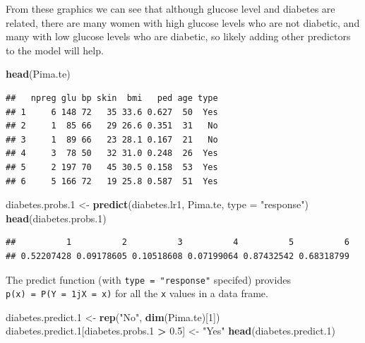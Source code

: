 \documentclass[]{article}
\newenvironment{Shaded}{\begin{snugshade}}{\end{snugshade}}
\newcommand{\KeywordTok}[1]{\textcolor[rgb]{0.13,0.29,0.53}{\textbf{#1}}}
\newcommand{\DataTypeTok}[1]{\textcolor[rgb]{0.13,0.29,0.53}{#1}}
\newcommand{\DecValTok}[1]{\textcolor[rgb]{0.00,0.00,0.81}{#1}}
\newcommand{\FloatTok}[1]{\textcolor[rgb]{0.00,0.00,0.81}{#1}}
\newcommand{\StringTok}[1]{\textcolor[rgb]{0.31,0.60,0.02}{#1}}
\newcommand{\OperatorTok}[1]{\textcolor[rgb]{0.81,0.36,0.00}{\textbf{#1}}}
\newcommand{\NormalTok}[1]{#1}
\begin{document}
From these graphics we can see that although glucose level and diabetes
are related, there are many women with high glucose levels who are not
diabetic, and many with low glucose levels who are diabetic, so likely
adding other predictors to the model will help.

\begin{Shaded}
\begin{Highlighting}[]
\KeywordTok{head}\NormalTok{(Pima.te)}
\end{Highlighting}
\end{Shaded}

\begin{verbatim}
##   npreg glu bp skin  bmi   ped age type
## 1     6 148 72   35 33.6 0.627  50  Yes
## 2     1  85 66   29 26.6 0.351  31   No
## 3     1  89 66   23 28.1 0.167  21   No
## 4     3  78 50   32 31.0 0.248  26  Yes
## 5     2 197 70   45 30.5 0.158  53  Yes
## 6     5 166 72   19 25.8 0.587  51  Yes
\end{verbatim}

\begin{Shaded}
\begin{Highlighting}[]
\NormalTok{diabetes.probs.}\DecValTok{1}\NormalTok{ <-}\StringTok{ }\KeywordTok{predict}\NormalTok{(diabetes.lr1, Pima.te, }\DataTypeTok{type =} \StringTok{"response"}\NormalTok{)}
\KeywordTok{head}\NormalTok{(diabetes.probs.}\DecValTok{1}\NormalTok{)}
\end{Highlighting}
\end{Shaded}

\begin{verbatim}
##          1          2          3          4          5          6 
## 0.52207428 0.09178605 0.10518608 0.07199064 0.87432542 0.68318799
\end{verbatim}

The predict function (with \texttt{type\ =\ "response"} specifed)
provides \texttt{p(x)\ =\ P(Y\ =\ 1jX\ =\ x)} for all the \texttt{x}
values in a data frame.

\begin{Shaded}
\begin{Highlighting}[]
\NormalTok{diabetes.predict.}\DecValTok{1}\NormalTok{ <-}\StringTok{ }\KeywordTok{rep}\NormalTok{(}\StringTok{"No"}\NormalTok{, }\KeywordTok{dim}\NormalTok{(Pima.te)[}\DecValTok{1}\NormalTok{])}
\NormalTok{diabetes.predict.}\DecValTok{1}\NormalTok{[diabetes.probs.}\DecValTok{1} \OperatorTok{>}\StringTok{ }\FloatTok{0.5}\NormalTok{] <-}\StringTok{ "Yes"}
\KeywordTok{head}\NormalTok{(diabetes.predict.}\DecValTok{1}\NormalTok{)}
\end{Highlighting}
\end{Shaded}
\end{document}
